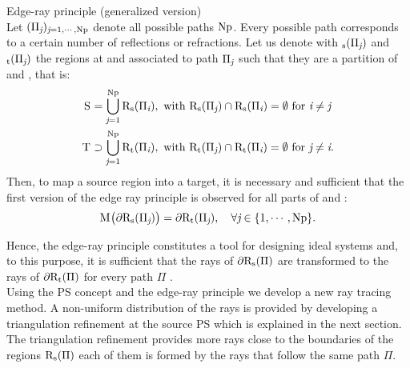 \begin{lemma}{Edge-ray principle (generalized version)}\\
Let $(\Pi_{\textit{j}})_{\textit{j}=1, \cdots, \textrm{Np}}$ denote all possible paths $\textrm{Np}$.
Every possible path corresponds to a certain number of reflections or refractions.
Let us denote with $_\textrm{s}(\Pi_{\textit{j}})$ and 
$_\textrm{t}(\Pi_{\textit{j}})$ the regions at  and  associated to path $\Pi_{\textit{j}}$ such that they are a partition of  and , that is:
\begin{equation*}
\begin{aligned}
\mbox{$\textup{S}_{\textit{}}$} &= \bigcup_{\textit{j}=1}^{\textrm{Np}} \mbox{$\textup{R}$}_\textrm{s}(\Pi_{\textit{i}}), \mbox{ with } \mbox{$\textup{R}$}_\textrm{s}(\Pi_{\textit{j}})\cap \mbox{$\textup{R}$}_\textrm{s}(\Pi_{\textit{i}}) = \emptyset \mbox{ for } \textit{i}\neq \textit{j}\\
\mbox{$\textup{T}_{\textit{}}$} & \supset \bigcup_{\textit{j}=1}^{\textrm{Np}} \mbox{$\textup{R}$}_\textrm{t}(\Pi_{\textit{i}}), \mbox{ with } \mbox{$\textup{R}$}_\textrm{t}(\Pi_{\textit{j}})\cap \mbox{$\textup{R}$}_\textrm{t}(\Pi_{\textit{i}}) = \emptyset \mbox{ for } \textit{j}\neq \textit{i}.
\end{aligned}
\end{equation*} 
Then, to map a source region into a target, it is necessary and sufficient that the first version of the edge ray principle is observed for all parts of  and : 
\begin{equation*}
\mathrm{M}_{\textit{}}\big(\partial\mbox{$\textup{R}$}_\textrm{s}(\Pi_{\textit{j}})\big) = \partial\mbox{$\textup{R}$}_\textrm{t}(\Pi_{\textit{j}}), \quad \forall \textit{j}\in\{1, \cdots, \textrm{Np}\}.
\end{equation*}
\end{lemma}
Hence, the edge-ray principle constitutes a tool for designing ideal systems and, to this purpose, it is sufficient that the rays of $\partial\mbox{$\textup{R}$}_\textrm{s}(\Pi)$ are transformed to the rays of $\partial\mbox{$\textup{R}$}_\textrm{t}(\Pi)$ for every path $\Pi$ \cite{minano1992new}. 
\\ \indent Using the PS concept and the edge-ray principle we develop a new ray tracing method. 
A non-uniform distribution of the rays is provided by developing a triangulation refinement at the source PS which is explained in the next section. 
The triangulation refinement provides more rays close to the boundaries of the regions $\mbox{$\textup{R}$}_\textrm{s}(\Pi)$ each of them is formed by the rays that follow the same path $\Pi$.
